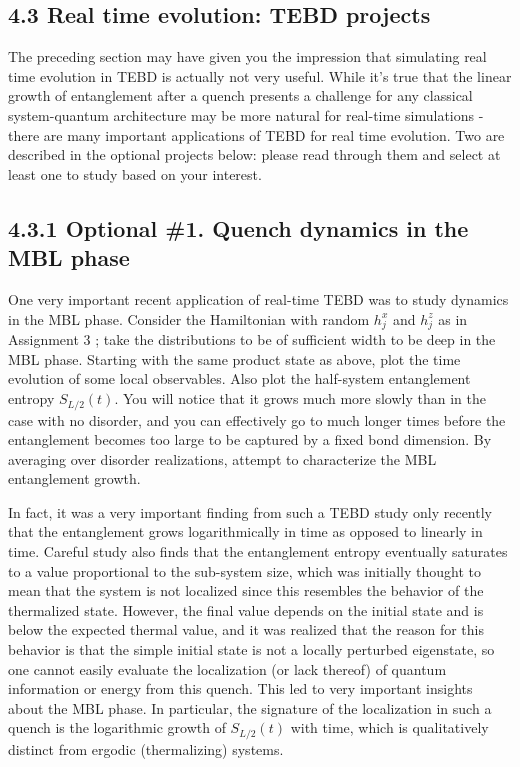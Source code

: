 \documentclass[12pt]{article}
\begin{document}
\subsection*{4.3 Real time evolution: TEBD projects}
The preceding section may have given you the impression that simulating real time evolution in TEBD is actually not very useful. While it's true that the linear growth of entanglement after a quench presents a challenge for any classical system-quantum architecture may be more natural for real-time simulations - there are many important applications of TEBD for real time evolution. Two are described in the optional projects below: please read through them and select at least one to study based on your interest.

\subsection*{4.3.1 Optional \#1. Quench dynamics in the MBL phase}
One very important recent application of real-time TEBD was to study dynamics in the MBL phase. Consider the Hamiltonian with random $h_{j}^{x}$ and $h_{j}^{z}$ as in Assignment 3 ; take the distributions to be of sufficient width to be deep in the MBL phase. Starting with the same product state as above, plot the time evolution of some local observables. Also plot the half-system entanglement entropy $S_{L / 2}(t)$. You will notice that it grows much more slowly than in the case with no disorder, and you can effectively go to much longer times before the entanglement becomes too large to be captured by a fixed bond dimension. By averaging over disorder realizations, attempt to characterize the MBL entanglement growth.

In fact, it was a very important finding from such a TEBD study only recently that the entanglement grows logarithmically in time as opposed to linearly in time. Careful study also finds that the entanglement entropy eventually saturates to a value proportional to the sub-system size, which was initially thought to mean that the system is not localized since this resembles the behavior of the thermalized state. However, the final value depends on the initial state and is below the expected thermal value, and it was realized that the reason for this behavior is that the simple initial state is not a locally perturbed eigenstate, so one cannot easily evaluate the localization (or lack thereof) of quantum information or energy from this quench. This led to very important insights about the MBL phase. In particular, the signature of the localization in such a quench is the logarithmic growth of $S_{L / 2}(t)$ with time, which is qualitatively distinct from ergodic (thermalizing) systems.
\end{document}
